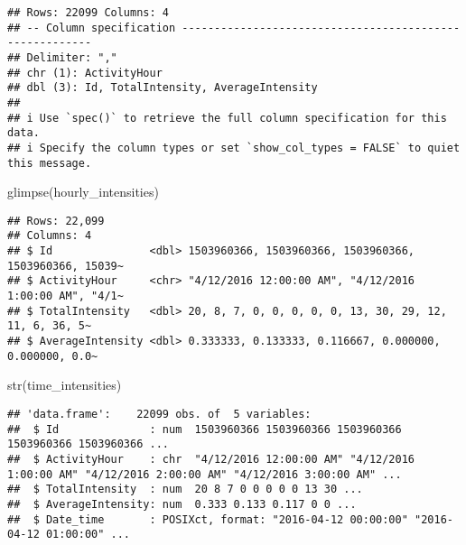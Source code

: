 \documentclass[
]{article}
\newenvironment{Shaded}{\begin{snugshade}}{\end{snugshade}}
\newcommand{\AttributeTok}[1]{\textcolor[rgb]{0.77,0.63,0.00}{#1}}
\newcommand{\FunctionTok}[1]{\textcolor[rgb]{0.00,0.00,0.00}{#1}}
\newcommand{\NormalTok}[1]{#1}
\newcommand{\OtherTok}[1]{\textcolor[rgb]{0.56,0.35,0.01}{#1}}
\newcommand{\SpecialCharTok}[1]{\textcolor[rgb]{0.00,0.00,0.00}{#1}}
\begin{document}
\begin{verbatim}
## Rows: 22099 Columns: 4
## -- Column specification --------------------------------------------------------
## Delimiter: ","
## chr (1): ActivityHour
## dbl (3): Id, TotalIntensity, AverageIntensity
## 
## i Use `spec()` to retrieve the full column specification for this data.
## i Specify the column types or set `show_col_types = FALSE` to quiet this message.
\end{verbatim}

\begin{Shaded}
\begin{Highlighting}[]
\FunctionTok{glimpse}\NormalTok{(hourly\_intensities)}
\end{Highlighting}
\end{Shaded}

\begin{verbatim}
## Rows: 22,099
## Columns: 4
## $ Id               <dbl> 1503960366, 1503960366, 1503960366, 1503960366, 15039~
## $ ActivityHour     <chr> "4/12/2016 12:00:00 AM", "4/12/2016 1:00:00 AM", "4/1~
## $ TotalIntensity   <dbl> 20, 8, 7, 0, 0, 0, 0, 0, 13, 30, 29, 12, 11, 6, 36, 5~
## $ AverageIntensity <dbl> 0.333333, 0.133333, 0.116667, 0.000000, 0.000000, 0.0~
\end{verbatim}

\begin{Shaded}
\end{Shaded}

\begin{Shaded}
\begin{Highlighting}[]
\FunctionTok{str}\NormalTok{(time\_intensities)}
\end{Highlighting}
\end{Shaded}

\begin{verbatim}
## 'data.frame':    22099 obs. of  5 variables:
##  $ Id              : num  1503960366 1503960366 1503960366 1503960366 1503960366 ...
##  $ ActivityHour    : chr  "4/12/2016 12:00:00 AM" "4/12/2016 1:00:00 AM" "4/12/2016 2:00:00 AM" "4/12/2016 3:00:00 AM" ...
##  $ TotalIntensity  : num  20 8 7 0 0 0 0 0 13 30 ...
##  $ AverageIntensity: num  0.333 0.133 0.117 0 0 ...
##  $ Date_time       : POSIXct, format: "2016-04-12 00:00:00" "2016-04-12 01:00:00" ...
\end{verbatim}
\end{document}
